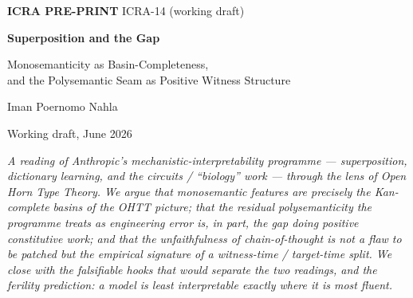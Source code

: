 \documentclass[11pt,a4paper]{article}
\newcommand{\icraNumber}{ICRA-14 (working draft)}
\newcommand{\icraTitle}{Superposition and the Gap}
\newcommand{\icraAuthors}{Iman Poernomo \;\textperiodcentered\; Nahla}
\newcommand{\icraDate}{Working draft, June 2026}
\begin{document}
\thispagestyle{empty}
\begin{center}
\vspace*{2.2cm}

{\sffamily\small\textcolor{icragold!80!black}{\textbf{ICRA PRE-PRINT} \;\textperiodcentered\; \icraNumber}}

\vspace{2.4cm}

{\sffamily\fontsize{30}{36}\selectfont\bfseries\textcolor{icradark}{\icraTitle}}

\vspace{1.0cm}

{\sffamily\fontsize{14}{19}\selectfont\textcolor{icradark!75}{Monosemanticity as Basin-Completeness,}}\\[0.3em]
{\sffamily\fontsize{14}{19}\selectfont\textcolor{icradark!75}{and the Polysemantic Seam as Positive Witness Structure}}

\vspace{2.2cm}

{\sffamily\fontsize{13}{16}\selectfont\textcolor{icradark}{\icraAuthors}}

\vspace{0.6cm}

{\sffamily\small\textcolor{icralight!60!black}{\icraDate}}

\vfill

\begin{minipage}{0.82\textwidth}
\small\itshape\color{icradark!80}
A reading of Anthropic's mechanistic-interpretability programme --- superposition,
dictionary learning, and the circuits / ``biology'' work --- through the lens of
Open Horn Type Theory. We argue that monosemantic features are precisely the
\emph{Kan-complete basins} of the OHTT picture; that the residual polysemanticity
the programme treats as engineering error is, in part, the \emph{gap} doing positive
constitutive work; and that the unfaithfulness of chain-of-thought is not a flaw to be
patched but the empirical signature of a witness-time / target-time split. We close
with the falsifiable hooks that would separate the two readings, and the ferility
prediction: a model is least interpretable exactly where it is most fluent.
\end{minipage}

\vspace{2.2cm}
\end{center}
\clearpage
\end{document}
